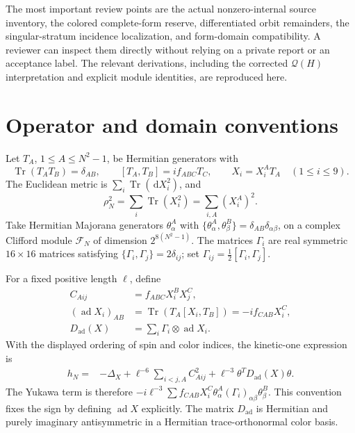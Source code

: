 \documentclass[11pt,letterpaper]{article}
\theoremstyle{definition}\newtheorem{hypothesis}[theorem]{Hypothesis}
\newcommand{\Tr}{\operatorname{Tr}}
\newcommand{\ad}{\operatorname{ad}}
\newcommand{\dd}{\,\mathrm{d}}
\newcommand{\QQ}{\mathcal Q}
\newcommand{\FF}{\mathcal F}
\numberwithin{equation}{section}
\begin{document}
The most important review points are the actual nonzero-internal source inventory, the colored complete-form reserve, differentiated orbit remainders, the singular-stratum incidence localization, and form-domain compatibility. A reviewer can inspect them directly without relying on a private report or an acceptance label. The relevant derivations, including the corrected $\QQ(H)$ interpretation and explicit module identities, are reproduced here.

\section{Operator and domain conventions}\label{sec:operator}
Let $T_A$, $1\le A\le N^2-1$, be Hermitian generators with
\begin{equation}
 \Tr(T_AT_B)=\delta_{AB},\qquad [T_A,T_B]=if_{ABC}T_C,
 \qquad X_i=X_i^AT_A\quad(1\le i\le9).
\end{equation}
The Euclidean metric is $\sum_i\Tr(\dd X_i^2)$, and
\begin{equation}
 \rho_N^2=\sum_i\Tr(X_i^2)=\sum_{i,A}(X_i^A)^2.
\end{equation}
Take Hermitian Majorana generators $\theta^A_\alpha$ with
$\{\theta^A_\alpha,\theta^B_\beta\}=\delta_{AB}\delta_{\alpha\beta}$, on a complex Clifford module $\FF_N$ of dimension $2^{8(N^2-1)}$. The matrices $\Gamma_i$ are real symmetric $16\times16$ matrices satisfying $\{\Gamma_i,\Gamma_j\}=2\delta_{ij}$; set $\Gamma_{ij}=\frac12[\Gamma_i,\Gamma_j]$.

For a fixed positive length $\ell$, define
\begin{align}
 C_{Aij}&=f_{ABC}X_i^BX_j^C,\\
 (\ad X_i)_{AB}&=\Tr(T_A[X_i,T_B])=-if_{CAB}X_i^C,\\
 D_{\ad}(X)&=\sum_i\Gamma_i\otimes\ad X_i.
\end{align}
With the displayed ordering of spin and color indices, the kinetic-one expression is
\begin{align}
 h_N={}&-\Delta_X+\ell^{-6}\sum_{i<j,A}C_{Aij}^2
              +\ell^{-3}\theta^T D_{\ad}(X)\theta.\label{eq:operator}
\end{align}
The Yukawa term is therefore
$-i\ell^{-3}\sum f_{CAB}X_i^C\theta^A_\alpha(\Gamma_i)_{\alpha\beta}\theta^B_\beta$.
This convention fixes the sign by defining $\ad X$ explicitly. The matrix $D_{\ad}$ is Hermitian and purely imaginary antisymmetric in a Hermitian trace-orthonormal color basis.
\end{document}
